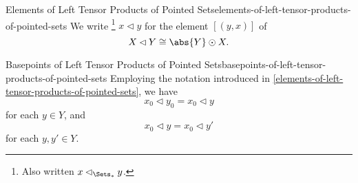 \begin{notation}{Elements of Left Tensor Products of Pointed Sets}{elements-of-left-tensor-products-of-pointed-sets}%
    We write%
    \footnote{%
        Also written $x\lhd_{\Sets_{*}}y$.
        \par\vspace*{\TCBBoxCorrection}
    } %
    $x\lhd y$ for the element $[(y,x)]$ of
    \[
        X\lhd Y%
        \cong%
        \abs{Y}\odot X.%
    \]%
\end{notation}
\begin{remark}{Basepoints of Left Tensor Products of Pointed Sets}{basepoints-of-left-tensor-products-of-pointed-sets}%
    Employing the notation introduced in \cref{elements-of-left-tensor-products-of-pointed-sets}, we have
    \[
        x_{0}\lhd y_{0}%
        =%
        x_{0}\lhd y%
    \]%
    for each $y\in Y$, and
    \[
        x_{0}\lhd y%
        =%
        x_{0}\lhd y'%
    \]%
    for each $y,y'\in Y$.
\end{remark}

